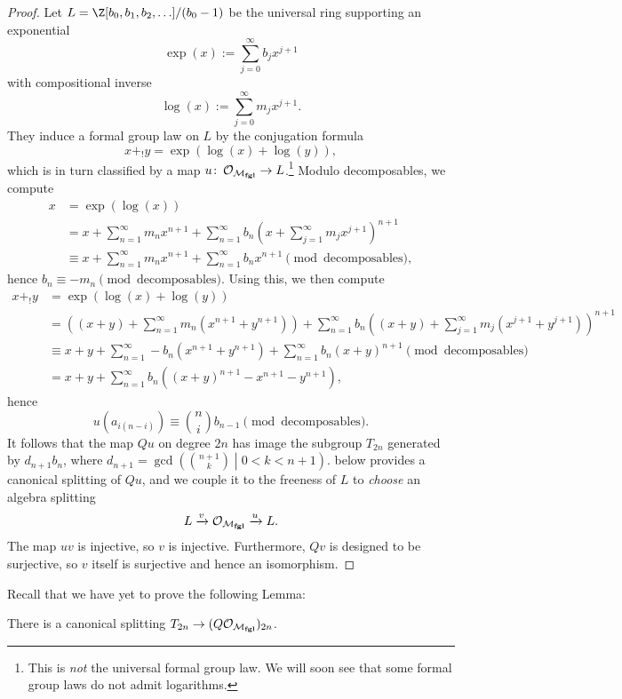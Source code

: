 \begin{proof}
Let $L = \Z[b_0, b_1, b_2, \ldots] / (b_0 - 1)$ be the universal ring supporting an exponential \[\exp(x) := \sum_{j=0}^\infty b_j x^{j+1}\] with compositional inverse \[\log(x) := \sum_{j=0}^\infty m_j x^{j+1}.\]  They induce a formal group law on $L$ by the conjugation formula \[x +_! y = \exp(\log(x) + \log(y)),\] which is in turn classified by a map $u\colon\thinspace \mathcal{O}_{\mathcal{M}_{\mathbf{fgl}}} \to L$.\footnote{This is \emph{not} the universal formal group law.  We will soon see that some formal group laws do not admit logarithms.}  Modulo decomposables, we compute
\begin{align*}
x & = \exp(\log(x)) \\
& = x + \sum_{n=1}^\infty m_n x^{n+1} + \sum_{n=1}^\infty b_n \left( x + \sum_{j=1}^\infty m_j x^{j+1} \right)^{n+1} \\
& \equiv x + \sum_{n=1}^\infty m_n x^{n+1} + \sum_{n=1}^\infty b_n x^{n+1} \pmod{\text{decomposables}},
\end{align*}
hence $b_n \equiv -m_n \pmod{\text{decomposables}}$.  Using this, we then compute
\begin{align*}
x +_! y & = \exp(\log(x) + \log(y)) \\
& = \left( (x + y) + \sum_{n=1}^\infty m_n (x^{n+1} + y^{n+1}) \right) + \sum_{n=1}^\infty b_n \left( (x + y) + \sum_{j=1}^\infty m_j (x^{j+1} + y^{j+1}) \right)^{n+1} \\
& \equiv x + y + \sum_{n=1}^\infty -b_n (x^{n+1} + y^{n+1}) + \sum_{n=1}^\infty b_n (x+y)^{n+1} \pmod{\text{decomposables}} \\
& = x + y + \sum_{n=1}^\infty b_n ((x+y)^{n+1} - x^{n+1} - y^{n+1}),
\end{align*}
hence \[u(a_{i(n-i)}) \equiv \binom{n}{i} b_{n-1} \pmod{\text{decomposables}}.\]  It follows that the map $Qu$ on degree $2n$ has image the subgroup $T_{2n}$ generated by $d_{n+1} b_n$, where $d_{n+1} = \gcd\left( \binom{n+1}{k} \middle| 0 < k < n + 1 \right)$.   below provides a canonical splitting of $Qu$, and we couple it to the freeness of $L$ to \emph{choose} an algebra splitting \[L \xrightarrow{v} \mathcal{O}_{\mathcal{M}_{\mathbf{fgl}}} \xrightarrow{u} L.\]  The map $uv$ is injective, so $v$ is injective.  Furthermore, $Qv$ is designed to be surjective, so $v$ itself is surjective and hence an isomorphism.
\end{proof}

Recall that we have yet to prove the following Lemma:

\begin{lemma}\label{LazardSplittingLemma}
There is a canonical splitting $T_{2n} \to (Q \mathcal O_{\mathcal{M}_{\mathbf{fgl}}})_{2n}$.
\end{lemma}

